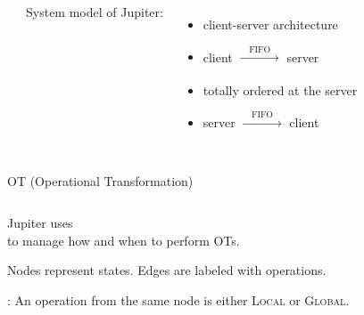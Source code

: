 
\begin{frame}{}
  \centerline{\Huge {}}
\end{frame}

\begin{frame}{}
  \begin{columns}
      \begin{center}
	
      \end{center}
      System model of Jupiter: \\[5pt]
      \begin{itemize}
	\setlength{\itemsep}{10pt}
	\item<1-> client-server architecture
	\item<2-> client $\xrightarrow[]{\quad \text{FIFO} \quad}$ server
	\item<3-> totally ordered at the server
	\item<4-> server $\xrightarrow[]{\quad \text{FIFO} \quad}$ client
      \end{itemize}
  \end{columns}
\end{frame}

\begin{frame}{}
  \centerline{OT (Operational Transformation)~}

  \begin{columns}[c]
      \begin{center}
	
      \end{center}
  \end{columns}
\end{frame}

\begin{frame}{}
  \begin{center}
    {\large Jupiter uses ~ \\
    to manage how and when to perform OTs.}
  \end{center}


  \begin{center} 
    \pause
    Nodes represent states. \quad Edges are labeled with operations.

    \pause
    : An operation from the same node is either \textsc{Local} or \textsc{Global}. 
  \end{center}
\end{frame}

